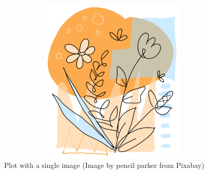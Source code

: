 \begin{figure}[htbp]
    \includegraphics[width=14cm, height=8cm, keepaspectratio]{figures/image1.PNG}
    \centering
    \caption{Plot with a single image (Image by pencil parker from Pixabay)}
    \label{fig:fig4}
\end{figure}